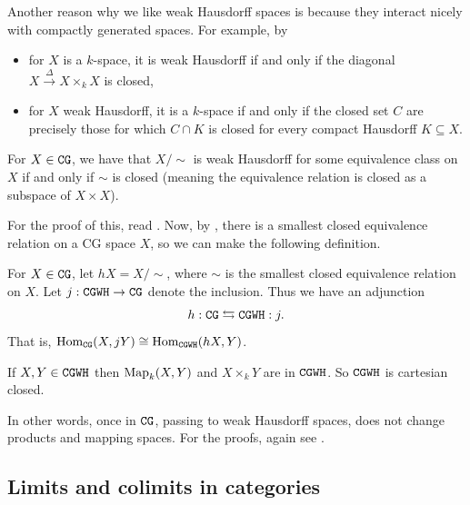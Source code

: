 \documentclass{article}[11pt]
\begin{document}
Another reason why we like weak Hausdorff spaces is because they interact nicely with compactly generated spaces. For example, by \cite[Lemma 1.4. and Proposition 2.14]{Strickland-cgwh}
\vspace{-1em}
\begin{itemize}\itemsep=0em
\item for $X$ is a $k$-space, it is weak Hausdorff if and only if the diagonal $X\xrightarrow{\Delta} X\times_k X$ is closed,
\item for $X$ weak Hausdorff, it is a $k$-space if and only if the closed set $C$ are precisely those for which $C\cap K$ is closed for every compact Hausdorff $K\subseteq X.$
\end{itemize}

\begin{proposition} For $X \in \texttt{CG}$, we have that $X\Big/\sim$ is weak Hausdorff for some equivalence class on $X$ if and only if $\sim$ is closed (meaning the equivalence relation is closed as a subspace of $X\times X$).
\end{proposition}

For the proof of this, read \cite[Corollary 2.21]{Strickland-cgwh}. Now, by \cite[Proposition 2.22]{Strickland-cgwh}, there is a smallest closed equivalence relation on a CG space $X$, so we can make the following definition.

\begin{definition} For $X\in \texttt{CG}$, let $hX = X\Big/\sim$, where $\sim$ is the smallest closed equivalence relation on $X$. Let $j: \texttt{CGWH} \to \texttt{CG}$ denote the inclusion. Thus we have an adjunction
\begin{align*}
	h : \texttt{CG} \leftrightarrows \texttt{CGWH}: j.
\end{align*}
That is, $\textup{Hom}_{\texttt{CG}} (X, jY) \cong \textup{Hom}_{\texttt{CGWH}} (hX,Y)$. %
\end{definition}

\begin{proposition} If $X,Y\in \texttt{CGWH}$ then $\textup{Map}_k (X, Y)$ and $X\times_k Y$ are in $\texttt{CGWH}$. So $\texttt{CGWH}$ is cartesian closed.
\end{proposition}

In other words, once in $\texttt{CG}$, passing to weak Hausdorff spaces, does not change products and mapping spaces. For the proofs, again see \cite[Corollary 2.16 and Proposition 2.24]{Strickland-cgwh}.

\subsection{Limits and colimits in categories}
\end{document}
